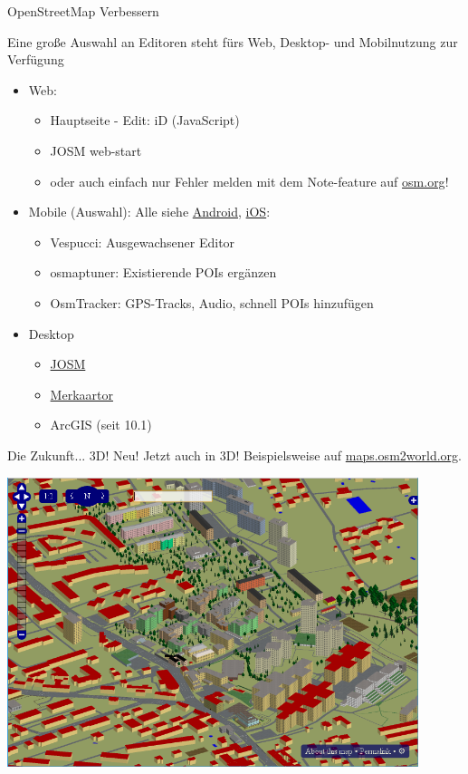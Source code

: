 \documentclass{beamer}
\begin{document}
\begin{frame}{OpenStreetMap Verbessern}

  Eine große Auswahl an Editoren steht fürs Web, Desktop- und Mobilnutzung zur Verfügung

  \begin{itemize}
    \item Web:
    \begin{itemize}
	    \item Hauptseite - Edit: iD (JavaScript)
      \item JOSM web-start
      \item oder auch einfach nur Fehler melden mit dem Note-feature auf \href{http://osm.org}{osm.org}!
	      \pause
    \end{itemize}
    \item Mobile (Auswahl): Alle siehe  \href{http://wiki.openstreetmap.org/wiki/Android\#OpenStreetMap\_editing\_features}{Android}, \href{http://wiki.openstreetmap.org/wiki/Apple\_iOS\#OpenStreetMap\_editing\_features}{iOS}:
    \begin{itemize}
      \item Vespucci: Ausgewachsener Editor
      \item osmaptuner: Existierende POIs ergänzen
      \item OsmTracker: GPS-Tracks, Audio, schnell POIs hinzufügen
    \end{itemize}
  \item Desktop
    \begin{itemize}
      \item \href{http://josm.openstreetmap.de}{JOSM}
      \item \href{http://merkaartor.be}{Merkaartor}
      \item ArcGIS (seit 10.1)
    \end{itemize}
  \end{itemize}

\end{frame}



\begin{frame}{Die Zukunft... 3D! }
  Neu! Jetzt auch in 3D! Beispielsweise auf \href{http://maps.osm2world.org/?zoom=17&lat=47.06156&lon=15.46983&layers=BF0FTFFF}{maps.osm2world.org}.

  \includegraphics[width=0.9\textwidth]{3d.png}


\end{frame}
\end{document}
